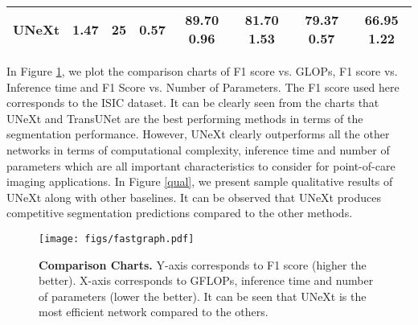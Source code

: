 \documentclass[runningheads]{llncs}
\begin{document}
\begin{table}[htbp]
{\begin{tabular}{c|c|c|c|cc|cc}
\textbf{UNeXt}                & \textbf{1.47}                        & \textbf{25}                                                                        & \textbf{0.57}                    & \textbf{89.70  0.96}           & \textbf{81.70  1.53} & \textbf{79.37  0.57}             & \textbf{66.95  1.22} \\ \hline
\end{tabular}}
\end{table}

In Figure \ref{graph}, we plot the comparison  charts of F1 score vs. GLOPs, F1 score vs. Inference time and F1 Score vs. Number of Parameters. The F1 score used here corresponds to the ISIC dataset. It can be clearly seen from the charts that UNeXt and TransUNet are the best performing methods in terms of the segmentation performance. However, UNeXt clearly outperforms all the other networks in terms of computational complexity, inference time and number of parameters which are all important characteristics to consider for point-of-care imaging applications. In Figure \ref{qual}, we present sample qualitative results of UNeXt along with other baselines. It can be observed that UNeXt produces competitive segmentation predictions compared to the other methods.


\begin{figure}[htbp]
	\centering
	\texttt{[image: figs/fastgraph.pdf]}
	
	\vskip-11pt\caption{\textbf{Comparison Charts.} Y-axis corresponds to F1 score (higher the better). X-axis corresponds to GFLOPs, inference time and number of parameters (lower the better). It can be seen that UNeXt is the most efficient network  compared to the others.  }  
	\label{graph}

\end{figure}
\end{document}
